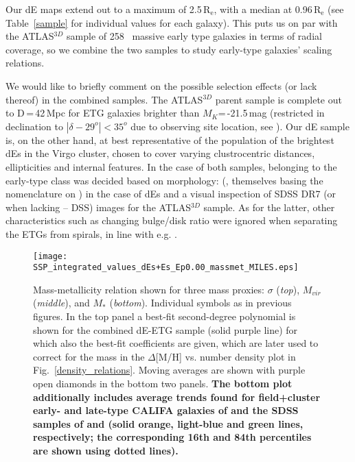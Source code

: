 \documentclass[useAMS,usenatbib]{mn2e}
\newcommand{\re}{$\mathrm{R_e}$}
\begin{document}
Our dE maps extend out to a maximum of  2.5\,{\re}, with a median at 0.96\,{\re} (see Table~\ref{sample} for individual values for each galaxy). This puts us on par with the ATLAS$^{3D}$ sample of 258~ massive early type galaxies in terms of radial coverage, so we combine the two samples to study early-type galaxies' scaling relations.

We would like to briefly comment on the possible selection effects (or lack thereof) in the combined samples. The ATLAS$^{3D}$ parent sample is complete out to D\,=\,42\,Mpc for ETG galaxies brighter than $M_K$=\,-21.5\,mag (restricted in declination to $|\delta-29^o| < 35^o$ due to observing site location, see \citealt{cappellari:2011}). Our dE sample is, on the other hand, at best representative of the population of the brightest dEs in the Virgo cluster, chosen to cover varying clustrocentric distances, ellipticities and internal features. In the case of both samples, belonging to the early-type class was decided based on morphology: \citeauthor{lisker:2006a} (\citeyear{lisker:2006a}, themselves basing the nomenclature on \citealt{binggeli:1985}) in the case of dEs and a visual inspection of SDSS DR7 (or when lacking -- DSS) images for the ATLAS$^{3D}$ sample. As for the latter, other characteristics such as changing bulge/disk ratio were ignored when separating the ETGs from spirals, in line with e.g. \cite{sandage:1975}.

\begin{figure}
\centering
\texttt{[image: SSP\_integrated\_values\_dEs+Es\_Ep0.00\_massmet\_MILES.eps]}
\caption{Mass-metallicity relation shown for three mass proxies: $\sigma$ (\textit{top}), $M_{vir}$ (\textit{middle}), and $M_{*}$ (\textit{bottom}). Individual symbols as in previous figures. In the top panel a best-fit second-degree polynomial is shown for the combined dE-ETG sample (solid purple line) for which also the best-fit coefficients are given, which are later used to correct for the mass in the $\Delta$[M/H] vs. number density plot in Fig.~\ref{density_relations}. Moving averages are shown with purple open diamonds in the bottom two panels. \textbf{The bottom plot additionally includes average trends found for field+cluster early- and late-type CALIFA galaxies of \protect\cite{gonzalezdelgado:2014b} and the SDSS samples of \protect\cite{gallazzi:2005} and \protect\cite{panter:2008} (solid orange, light-blue and green lines, respectively; the corresponding 16th and 84th percentiles are shown using dotted lines).}}
\label{mass-met-relation}  
\end{figure}
\end{document}
